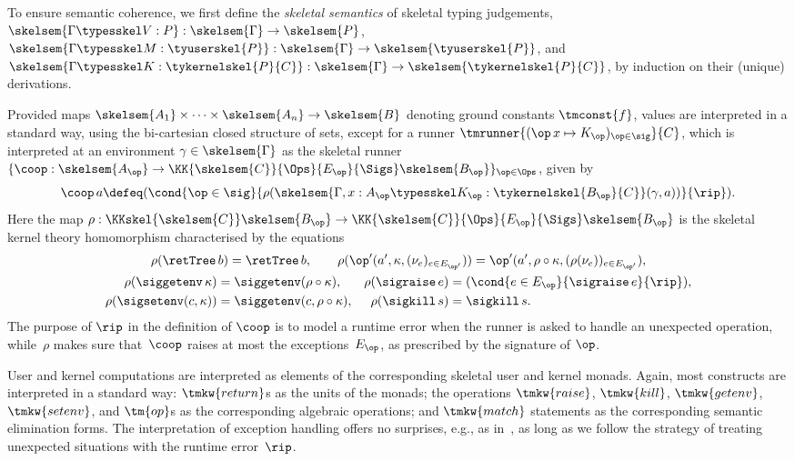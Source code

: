 To ensure semantic coherence, we first define the \emph{skeletal semantics} of skeletal
typing judgements, 
%
$\skelsem{\Gamma \typesskel V : P} : \skelsem{\Gamma} \to \skelsem{P}$,
%
$\skelsem{\Gamma \typesskel M : \tyuserskel{P}} : \skelsem{\Gamma} \to \skelsem{\tyuserskel{P}}$,
and
$\skelsem{\Gamma \typesskel K : \tykernelskel{P}{C}} : \skelsem{\Gamma} \to \skelsem{\tykernelskel{P}{C}}$, 
%
by induction on their (unique) derivations.

Provided maps $\skelsem{A_1} \times \cdots \times \skelsem{A_n} \to \skelsem{B}$
denoting ground constants $\tmconst{f}$, 
values are interpreted in a standard
way, using the bi-cartesian closed structure of sets, except for a runner
$\tmrunner{(\op\, x \mapsto K_\op)_{\op \in \sig}}{C}$, which is interpreted at
an environment $\gamma \in \skelsem{\Gamma}$ as the skeletal runner
$\{\coop : \skelsem{A_\op} \to \KK{\skelsem{C}}{\Ops}{E_\op}{\Sigs} \skelsem{B_\op}\}_{\op
  \in \Ops}$, given by
%
\begin{equation*}
  \coop\,a \defeq
  (\cond
        {\op \in \sig}
        {\rho(\skelsem{\Gamma, x : A_\op \typesskel K_\op : \tykernelskel{B_\op}{C}}(\gamma, a))}
        {\rip}).
\end{equation*}
%
Here the map 
$\rho : \KKskel{\skelsem{C}} \skelsem{B_\op} \to \KK{\skelsem{C}}{\Ops}{E_\op}{\Sigs}
\skelsem{B_\op}$ is the skeletal kernel theory homomorphism characterised by the equations
%
\begin{gather*}
  \rho (\retTree \, b) = \retTree \, b, 
  \qquad
  \rho (\op'(a', \kappa, (\nu_e)_{e \in E_{\op'}})) =
     \op'(a', \rho \circ \kappa, (\rho(\nu_e))_{e \in E_{\op'}}), 
  \\
  \begin{aligned}
    \rho (\siggetenv\,\kappa) &= \siggetenv (\rho \circ \kappa), 
    &
    \rho (\sigraise\,e) &= (\cond {e \in E_\op} {\sigraise\, e} {\rip}), 
    \\
    \rho (\sigsetenv (c, \kappa)) &= \siggetenv (c, \rho \circ \kappa), 
    &
    \rho (\sigkill\,s) &= \sigkill\,s.
  \end{aligned}
\end{gather*}
%
The purpose of $\rip$ in the definition of $\coop$ is to model a runtime error
when the runner is asked to handle an unexpected operation, while~$\rho$ makes sure
that~$\coop$ raises at most the exceptions~$E_\op$, as prescribed by the 
signature of $\op$.

User and kernel computations are interpreted as elements of the corresponding skeletal
user and kernel monads. Again, most constructs are interpreted in a standard way:
$\tmkw{return}$s as the units of the monads; the operations $\tmkw{raise}$,
$\tmkw{kill}$, $\tmkw{getenv}$, $\tmkw{setenv}$, and $\tm{op}$s as the corresponding
algebraic operations; and $\tmkw{match}$ statements as the corresponding semantic
elimination forms. The interpretation of exception handling offers no surprises, e.g., as
in~\cite{Plotkin:HandlingEffects}, as long as we follow the strategy of treating
unexpected situations with the runtime error~$\rip$.

